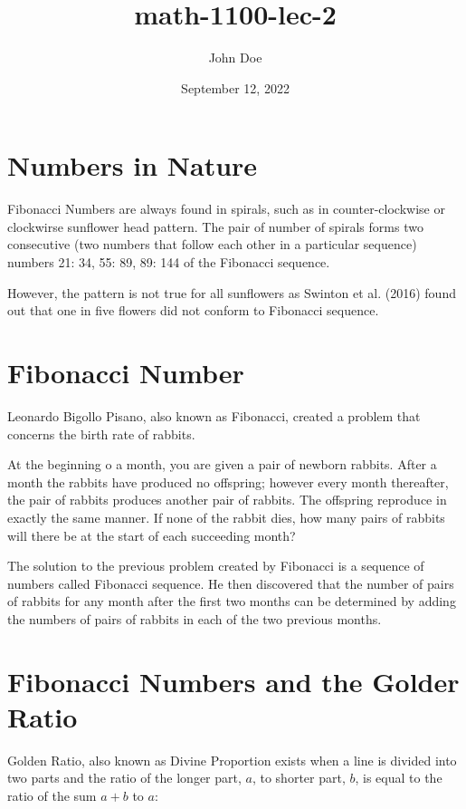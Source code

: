 \documentclass[12pt, UTF8]{article}
\title{math-1100-lec-2}
\author{John Doe}
\date{September 12, 2022}
\begin{document}
	\maketitle
	
	\section*{Numbers in Nature}
	
	Fibonacci Numbers are always found in spirals, such as in counter-clockwise or clockwirse sunflower head pattern. The pair of number of spirals forms two consecutive (two numbers that follow each other in a particular sequence) numbers {21: 34, 55: 89, 89: 144} of the Fibonacci sequence.
	
	However, the pattern is not true for all sunflowers as Swinton et al. (2016) found out that one in five flowers did not conform to Fibonacci sequence.
	
	\section{Fibonacci Number}
	
	Leonardo Bigollo Pisano, also known as Fibonacci, created a problem that concerns the birth rate of rabbits.
	
	\begin{displayquote}
		At the beginning o a month, you are given a pair of newborn rabbits. After a month the rabbits have produced no offspring; however every month thereafter, the pair of rabbits produces another pair of rabbits. The offspring reproduce in exactly the same manner. If none of the rabbit dies, how many pairs of rabbits will there be at the start of each succeeding month?
	\end{displayquote}
	
	The solution to the previous problem created by Fibonacci is a sequence of numbers called Fibonacci sequence. He then discovered that the number of pairs of rabbits for any month after the first two months can be determined by adding the numbers of pairs of rabbits in each of the two previous months.
	
	\section{Fibonacci Numbers and the Golder Ratio}
	
	Golden Ratio, also known as Divine Proportion exists when a line is divided into two parts and the ratio of the longer part, $a$, to shorter part, $b$, is equal to the ratio of the sum $a+b$ to $a$:
	
\end{document}

